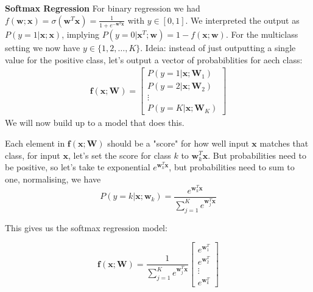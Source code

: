 \documentclass[a4paper, 11pt]{article}
\begin{document}
{\Large\textbf{Softmax Regression}}
For binary regression we had $f(\mathbf{w};\mathbf{x}) = \sigma(\mathbf{w}^{T}\mathbf{x}) = \frac{1}{1 + e^{-\mathbf{w}^{T}\mathbf{x}}}$ with $y\in[0, 1]$. We interpreted
the output as $P(y = 1|\mathbf{x};\mathbf{x})$, implying $P(y = 0|\mathbf{x}^{T};\mathbf{w}) = 1 - f(\mathbf{x};\mathbf{w})$.
For the multiclass setting we now have $y\in\{1, 2, \dots, K\}$. Ideia: instead of just outputting a single value for the positive class, let's output a vector
of probabiblities for aech class:
\begin{align*}
        \mathbf{f}(\mathbf{x};\mathbf{W}) = \left[
                \begin{array}{c}
                        P(y = 1|\mathbf{x};\mathbf{W}_1)\\
                        P(y = 2|\mathbf{x};\mathbf{W}_2)\\
                        \vdots\\
                        P(y = K|\mathbf{x};\mathbf{W}_K)
                \end{array}
                \right]
\end{align*}
We will now build up to a model that does this. 

Each element in $\mathbf{f}(\mathbf{x};\mathbf{W})$ should be a "score" for how well input $\mathbf{x}$ matches that class, for input $\mathbf{x}$, let's set the score for class $k$ to $\mathbf{w}_{k}^{T}\mathbf{x}$.
But probabilities need to be positive, so let's take te exponential $e^{\mathbf{w}_{k}^{T}\mathbf{x}}$, but probabilities need to sum to one, normalising, we have
\begin{equation}
        P(y = k|\mathbf{x};\mathbf{w}_k) = \frac{e^{\mathbf{w}_{k}^{T}\mathbf{x}}}{\sum\limits_{j = 1}^{K}e^{\mathbf{w}_{j}^{T}\mathbf{x}}}
\end{equation}

This gives us the softmax regression model:

\begin{equation*}
        \mathbf{f}(\mathbf{x};\mathbf{W}) = \frac{1}{\sum\limits_{j = 1}^{K}e^{\mathbf{w}_{j}^{T}\mathbf{x}}}\left[\begin{array}{c}
        e^{\mathbf{w}_{1}^{T}}\\
        e^{\mathbf{w}_{2}^{T}}\\
        \vdots\\
        e^{\mathbf{w}_{k}^{T}}
        \end{array}\right]
\end{equation*}
\end{document}
